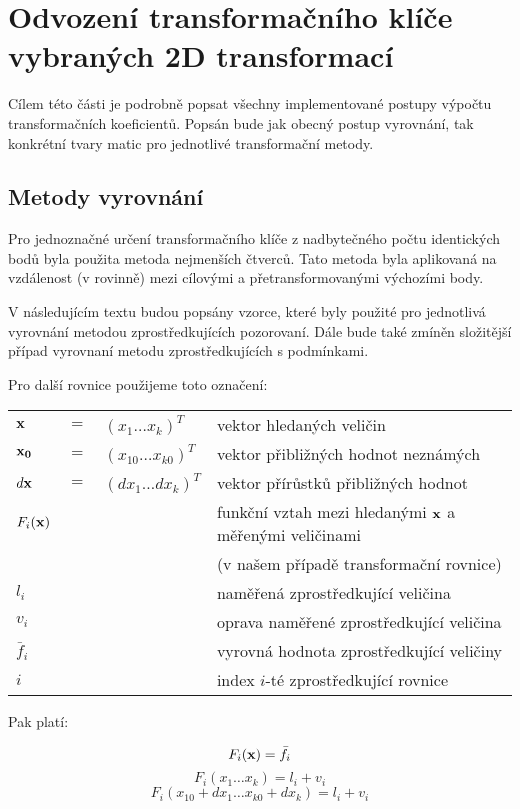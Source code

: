 \section{Odvození transformačního klíče vybraných 2D transformací}

Cílem této části je podrobně popsat všechny implementované postupy výpočtu
transformačních koeficientů. Popsán bude jak obecný postup vyrovnání, tak
konkrétní tvary matic pro jednotlivé transformační metody.
\subsection{Metody vyrovnání}
\label{kapvyr}
Pro jednoznačné určení transformačního klíče z nadbytečného počtu identických bodů byla použita metoda
nejmenších čtverců. Tato metoda byla aplikovaná na vzdálenost (v rovinně) mezi
cílovými a přetransformovanými výchozími body. 

V následujícím textu budou popsány vzorce, které byly použité pro jednotlivá
vyrovnání metodou zprostředkujících pozorovaní. Dále bude také zmíněn
složitější případ vyrovnaní metodu zprostředkujících s podmínkami.

Pro další rovnice použijeme toto označení:

\begin{table}[h]
\centering

\begin{tabular}{llll}
$ {\bf x} $&$=$& $(x_1 \ldots x_k)^T$  & vektor hledaných veličin\\
$ {\bf x_0} $&$=$&$(x_{10} \ldots x_{k0})^T$  & vektor přibližných hodnot
neznámých\\
$ d {\bf x} $&$=$&$(dx_1 \ldots dx_k)^T$  & vektor přírůstků přibližných
hodnot\\

$ F_i(\bf x)$ &&& funkční vztah mezi hledanými $ \bf x$ a měřenými
veličinami \\
&&&(v našem případě transformační rovnice)\\
$ l_i$ &&& naměřená zprostředkující veličina \\
$ v_i$ &&& oprava naměřené zprostředkující veličina \\
$ \bar{f}_i$ &&& vyrovná hodnota zprostředkující veličiny \\
$i$ &&& index $i$-té zprostředkující rovnice
\end{tabular}
\end{table}

Pak platí:

$$F_i ({\bf x}) = \bar{f}_i$$
$$F_i (x_1 \ldots x_k) = l_i + v_i$$
$$F_i (x_{10} +dx_1 \ldots x_{k0} +dx_k) = l_i + v_i$$

